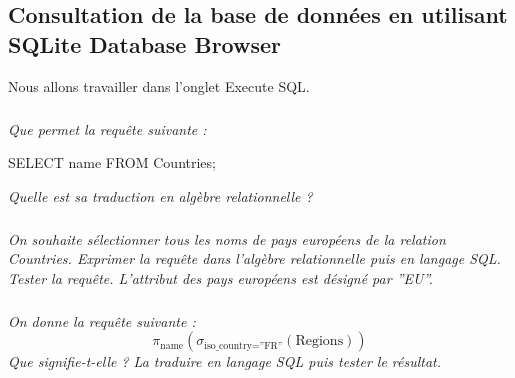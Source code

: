 \documentclass[10pt]{article}
\newif\ifprof
\begin{document}
\ifprof
\begin{corrige}
Manipulation à faire avec le logiciel. 
\end{corrige}
\else
\fi

\subsection*{Consultation de la base de données en utilisant SQLite Database Browser}

Nous allons travailler dans l'onglet \textsf{Execute SQL}.
\subparagraph{}
\textit{Que permet la requête suivante :}
\begin{envsql}
\begin{sql}
SELECT name FROM Countries;
\end{sql}
\end{envsql}

\textit{Quelle est sa traduction en algèbre relationnelle ?}

\ifprof
\begin{corrige}
Il s'agit d'une projection permettant de sélectionner le nom de tous les pays de la table Countries. 

Elle se traduit par :
$$
\pi_{\text{name}}\left(\text{Countries}\right)
$$
\end{corrige}
\else
\fi

\subparagraph{}
\textit{On souhaite sélectionner tous les noms de pays européens de la relation Countries.
 Exprimer la requête dans l'algèbre relationnelle puis en langage SQL. Tester la requête. L'attribut des pays européens est désigné par ''EU''.}

\ifprof
\begin{corrige}
$$
\pi_{\text{name}}\left(\sigma_{\text{continent=''EU''}}\left(\text{Countries}\right)\right)
$$
\begin{envsql}
\begin{sql}
SELECT name FROM Countries WHERE continent=''EU'';
\end{sql}
\end{envsql}
\end{corrige}



\else
\fi

\subparagraph{}
\textit{On donne la requête suivante : 
$$\pi_{\text{name}}\left(\sigma_{\text{iso\_country=''FR''}} (\text{Regions})\right) $$
Que signifie-t-elle ? La traduire en langage SQL puis tester le résultat. }


\ifprof
\begin{corrige}
Le but de cette requête est de déterminer la liste des régions de France.

\begin{envsql}
\begin{sql}
SELECT name FROM Regions WHERE iso_country=''FR'';
\end{sql}
\end{envsql}
\end{corrige}
\else
\fi
\end{document}
